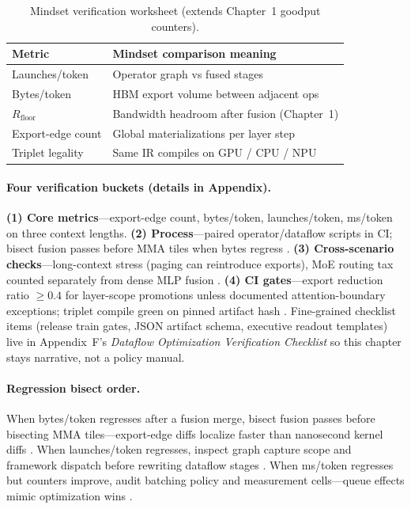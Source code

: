 \begin{table}[t]
\centering
\small
\begin{tabular}{@{}ll@{}}
\toprule
\textbf{Metric} & \textbf{Mindset comparison meaning} \\
\midrule
Launches/token & Operator graph vs fused stages \\
Bytes/token & HBM export volume between adjacent ops \\
$R_{\mathrm{floor}}$ & Bandwidth headroom after fusion (Chapter~1) \\
Export-edge count & Global materializations per layer step \\
Triplet legality & Same IR compiles on GPU / CPU / NPU \\
\bottomrule
\end{tabular}
\caption{Mindset verification worksheet (extends Chapter~1 goodput counters).}
\label{tab:ch02_dataflow_benchmark}
\end{table}

\paragraph{Four verification buckets (details in Appendix).}
\textbf{(1) Core metrics}---export-edge count, bytes/token, launches/token, ms/token on three context lengths.
\textbf{(2) Process}---paired operator/dataflow scripts in CI; bisect fusion passes before MMA tiles when bytes regress \citep{yirage2026}.
\textbf{(3) Cross-scenario checks}---long-context stress (paging can reintroduce exports), MoE routing tax counted separately from dense MLP fusion \citep{liu2024deepseekv3,kwon2023vllm}.
\textbf{(4) CI gates}---export reduction ratio ${\ge}0.4$ for layer-scope promotions unless documented attention-boundary exceptions; triplet compile green on pinned artifact hash \citep{taxbreak2026,memoryfloor2026}.
Fine-grained checklist items (release train gates, JSON artifact schema, executive readout templates) live in Appendix~F's \emph{Dataflow Optimization Verification Checklist} so this chapter stays narrative, not a policy manual.

\paragraph{Regression bisect order.}
When bytes/token regresses after a fusion merge, bisect fusion passes before bisecting MMA tiles---export-edge diffs localize faster than nanosecond kernel diffs \citep{yirage2026,memoryfloor2026}.
When launches/token regresses, inspect graph capture scope and framework dispatch before rewriting dataflow stages \citep{nvidia2024cudagraphs,taxbreak2026}.
When ms/token regresses but counters improve, audit batching policy and measurement cells---queue effects mimic optimization wins \citep{kwon2023vllm,patel2025llminference}.

